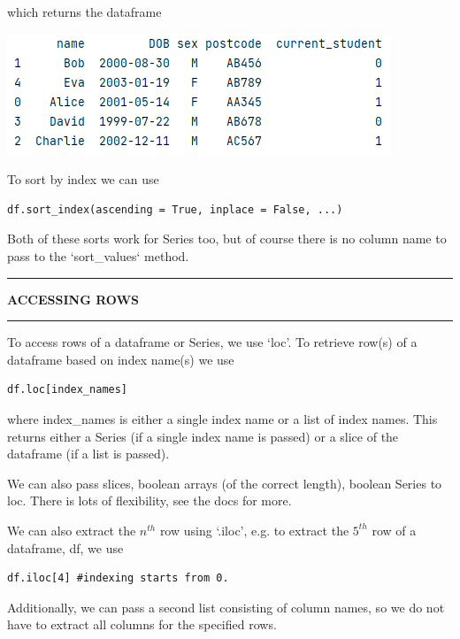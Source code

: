 \documentclass[8pt]{extarticle}
\newcommand{\heading}[1]{%
    \noindent
    \rule{\linewidth}{0.4pt}
    \begin{center}
        \vspace{-1ex}
        \textbf{#1}        
        \vspace{-2.5ex}
    \end{center}
    \rule{\linewidth}{0.4pt}
}
\begin{document}
\begin{multicols}{4}
which returns the dataframe

\begin{center}
\includegraphics[scale = 0.53]{images/sorted_df.png}
\end{center}

To sort by index we can use 

\begin{lstlisting}[style=Python]
df.sort_index(ascending = True, inplace = False, ...)
\end{lstlisting}

\begin{tcolorbox}[width=\columnwidth, colback=white!95!black]
Both of these sorts work for Series too, but of course there is no column name to pass to the `sort\_values` method.
\end{tcolorbox}

\heading{ACCESSING ROWS}

To access rows of a dataframe or Series, we use `loc'. To  retrieve row(s) of a dataframe based on index name(s) we use

\begin{lstlisting}[style=Python]
df.loc[index_names]
\end{lstlisting}
where index\_names is either a single index name or a list of index names. This returns either a Series (if a single index name is passed) or a slice of the dataframe (if a list is passed).

\begin{tcolorbox}[width=\columnwidth, colback=white!95!black]
We can also pass slices, boolean arrays (of the correct length), boolean Series to loc. There is lots of flexibility, see the docs for more. 
\end{tcolorbox}

We can also extract the $n^{th}$ row using `.iloc', e.g. to extract the $5^{th}$ row of a dataframe, df, we use 
\begin{lstlisting}[style=Python]
df.iloc[4] #indexing starts from 0.
\end{lstlisting}

\begin{tcolorbox}[width=\columnwidth, colback=white!95!black]
Additionally, we can pass a second list consisting of column names, so we do not have to extract all columns for the specified rows. 
\end{tcolorbox}


\end{multicols}
\end{document}
